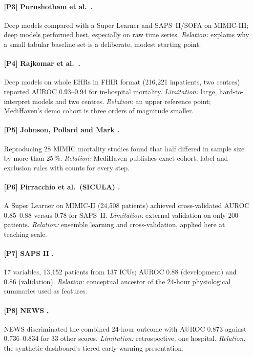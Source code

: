 \paragraph{[P3] Purushotham et al.\ \cite{purushotham2018benchmarking}.} Deep models compared with a
Super Learner and SAPS~II/SOFA on MIMIC-III; deep models performed best, especially on raw time series.
\emph{Relation:} explains why a small tabular baseline set is a deliberate, modest starting point.

\paragraph{[P4] Rajkomar et al.\ \cite{rajkomar2018scalable}.} Deep models on whole EHRs in FHIR format
(216{,}221 inpatients, two centres) reported AUROC 0.93--0.94 for in-hospital mortality.
\emph{Limitation:} large, hard-to-interpret models and two centres. \emph{Relation:} an upper reference
point; MediHaven's demo cohort is three orders of magnitude smaller.

\paragraph{[P5] Johnson, Pollard and Mark \cite{johnson2017reproducibility}.} Reproducing 28 MIMIC
mortality studies found that half differed in sample size by more than 25\,\%. \emph{Relation:} MediHaven
publishes exact cohort, label and exclusion rules with counts for every step.

\paragraph{[P6] Pirracchio et al.\ (SICULA) \cite{pirracchio2015sicula}.} A Super Learner on MIMIC-II
(24{,}508 patients) achieved cross-validated AUROC 0.85--0.88 versus 0.78 for SAPS~II.
\emph{Limitation:} external validation on only 200 patients. \emph{Relation:} ensemble learning and
cross-validation, applied here at teaching scale.

\paragraph{[P7] SAPS II \cite{legall1993sapsii}.} 17 variables, 13{,}152 patients from 137 ICUs; AUROC
0.88 (development) and 0.86 (validation). \emph{Relation:} conceptual ancestor of the 24-hour
physiological summaries used as features.

\paragraph{[P8] NEWS \cite{smith2013news}.} NEWS discriminated the combined 24-hour outcome with AUROC
0.873 against 0.736--0.834 for 33 other scores. \emph{Limitation:} retrospective, one hospital.
\emph{Relation:} the synthetic dashboard's tiered early-warning presentation.

